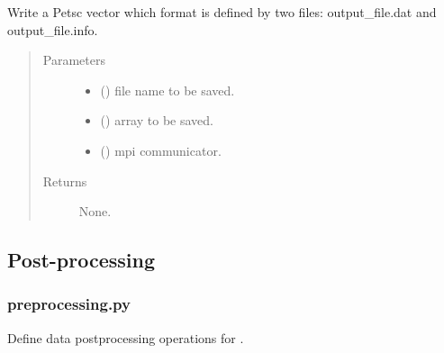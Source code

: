 \documentclass[letterpaper,10pt,english]{sphinxmanual}
\begin{document}
\begin{fulllineitems}
\label{\detokenize{petgem/parallel:petgem.parallel.writePetscVector}}
Write a Petsc vector which format is defined by two files: output\_file.dat and output\_file.info.
\begin{quote}\begin{description}
\item[{Parameters}] \leavevmode\begin{itemize}
\item {} 
 () \textendash{} file name to be saved.

\item {} 
 () \textendash{} array to be saved.

\item {} 
 () \textendash{} mpi communicator.

\end{itemize}

\item[{Returns}] \leavevmode
None.

\end{description}\end{quote}

\end{fulllineitems}



\subsection{Post-processing}
\label{\detokenize{Manual:post-processing}}

\subsubsection{preprocessing.py}
\label{\detokenize{petgem/postprocessing:module-petgem.postprocessing}}\label{\detokenize{petgem/postprocessing:preprocessing-py}}\label{\detokenize{petgem/postprocessing::doc}}
Define data postprocessing operations for .
\end{document}
